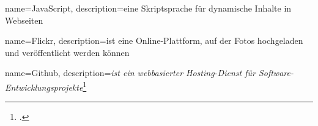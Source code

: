 
{
  name=JavaScript,
  description={eine Skriptsprache für dynamische Inhalte in Webseiten}
}

{
  name=Flickr,
  description={ist eine Online-Plattform, auf der Fotos hochgeladen und veröffentlicht werden können}
}

{
  name=Github,
  description={\emph{ist ein webbasierter Hosting-Dienst für Software-Entwicklungsprojekte}\footcite{wiki:github}}
}
